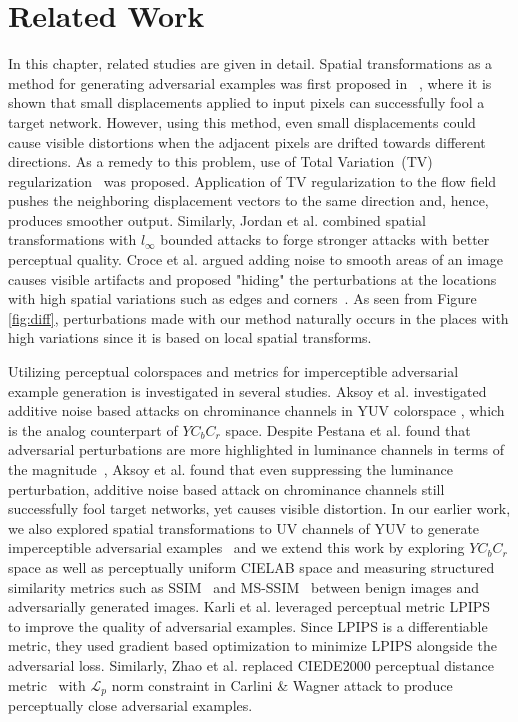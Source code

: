 \chapter{Related Work}
\label{chp:b2}

In this chapter, related studies are given in detail.
Spatial transformations as a method for generating adversarial examples was first proposed in ~\cite{xiao2018spatially}, where it is shown that small displacements applied to input pixels can successfully fool a target network. However, using this method, even small displacements could cause visible distortions when the adjacent pixels are drifted towards different directions. As a remedy to this problem, use of  Total Variation~(TV) regularization~\cite{estrela2016total} was proposed. Application of TV regularization to the flow field pushes the neighboring displacement vectors to the same direction and, hence, produces smoother output. Similarly, Jordan et al. combined spatial transformations with \(l_\infty\) bounded attacks to forge stronger attacks with better perceptual quality. Croce et al. argued adding noise to smooth areas of an image causes visible artifacts and proposed "hiding" the perturbations at the locations with high spatial variations such as edges and corners~\cite{croce2019sparse}. As seen from Figure \ref{fig:diff}, perturbations made with our method naturally occurs in the places with high variations since it is based on local spatial transforms.

Utilizing perceptual colorspaces and metrics for imperceptible adversarial example generation is investigated in several studies. Aksoy et al. investigated additive noise based attacks on chrominance channels in YUV colorspace \cite{aksoy2019attack}, which is the analog counterpart of \(YC_{b}C_{r}\) space. Despite Pestana et al. found that adversarial perturbations are more highlighted in luminance channels in terms of the magnitude~\cite{Pestana2020-hm}, Aksoy et al. found that even suppressing the luminance perturbation, additive noise based attack on chrominance channels still successfully fool target networks, yet causes visible distortion. In our earlier work, we also explored spatial transformations to UV channels of YUV to generate imperceptible adversarial examples~\cite{aydin2019imperceptible} and we extend this work by exploring \(YC_{b}C_{r}\) space as well as perceptually uniform CIELAB space and measuring structured similarity metrics such as SSIM~\cite{wang2004image} and MS-SSIM~\cite{wang2003multiscale} between benign images and adversarially generated images. Karli et al. leveraged perceptual metric LPIPS~\cite{zhang2018unreasonable} to improve the quality of adversarial examples. Since LPIPS is a differentiable metric, they used gradient based optimization to minimize LPIPS alongside the adversarial loss. Similarly, Zhao et al. replaced CIEDE2000 perceptual distance metric~\cite{luo2001development} with \(\mathcal{L}_{p}\) norm constraint in Carlini \& Wagner attack to produce perceptually close adversarial examples.

